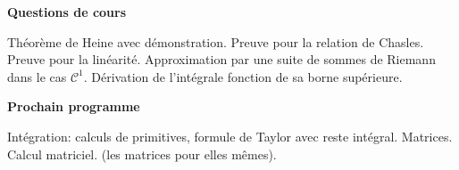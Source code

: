 







\bigskip
\begin{center}
\textbf{Questions de cours}
\end{center}
Théorème de Heine avec démonstration.\newline
Preuve pour la relation de Chasles.\newline
Preuve pour la linéarité. \newline
Approximation par une suite de sommes de Riemann dans le cas $\mathcal{C}^1$.\newline
Dérivation de l'intégrale fonction de sa borne supérieure.\newline

\begin{center}
\textbf{Prochain programme}
\end{center}
Intégration: calculs de primitives, formule de Taylor avec reste intégral.\newline
Matrices. Calcul matriciel. (les matrices pour elles mêmes).

